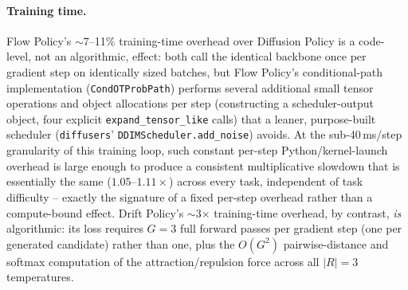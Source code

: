 \documentclass[11pt]{article}
\begin{document}
\paragraph{Training time.} Flow Policy's $\sim$7--11\% training-time
overhead over Diffusion Policy is a code-level, not an algorithmic, effect:
both call the identical backbone once per gradient step on identically
sized batches, but Flow Policy's conditional-path implementation
(\texttt{CondOTProbPath}) performs several additional small tensor
operations and object allocations per step (constructing a scheduler-output
object, four explicit \texttt{expand\_tensor\_like} calls) that a leaner,
purpose-built scheduler (\texttt{diffusers}' \texttt{DDIMScheduler.add\_noise})
avoids. At the sub-40\,ms/step granularity of this training loop, such
constant per-step Python/kernel-launch overhead is large enough to produce
a consistent multiplicative slowdown that is essentially the same
($1.05$--$1.11\times$) across every task, independent of task difficulty --
exactly the signature of a fixed per-step overhead rather than a
compute-bound effect. Drift Policy's $\sim$3$\times$ training-time
overhead, by contrast, \emph{is} algorithmic: its loss requires $G=3$ full
forward passes per gradient step (one per generated candidate) rather than
one, plus the $O(G^2)$ pairwise-distance and softmax computation of the
attraction/repulsion force across all $|R|=3$ temperatures.
\end{document}
